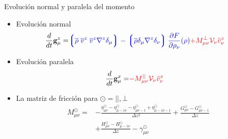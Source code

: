 \documentclass{beamer}
\newcommand{\llg}{\left\lgroup}
\newcommand{\rlg}{\right\rgroup}
\begin{document}
\begin{frame}{Evolución normal y paralela del momento}
\begin{itemize}
  \item Evolución normal 
\begin{align}
    \frac{d}{dt}{{\bf g}}^{z}_\mu=&
{\color{blue} \llg\overline{\rho}\; \overline{v}^{z}\;\overline{v}^{z}{\nabla}^{z}\delta_{\mu}\rlg
-\llg\overline{\rho}\delta_{\mu}{\nabla}^{z}\delta_{\nu}\rlg
\frac{\partial  F}{\partial \rho_{\nu}}(\rho)}
{\color{red} +M_{\mu\nu}^{\bot}{\cal V}_\nu\tilde{v}^{z}_\nu}
\nonumber
\end{align}
  \item Evolución paralela 
\begin{align}
  \frac{d}{dt}{{\bf g}}^x_\mu=&{\color{red}-M_{\mu\nu}^{||}{\cal V}_\nu\tilde{v}^x_\nu}
\nonumber
\end{align}
\item La matriz de fricción para $\odot=||,\bot$
\begin{align}
M^{\odot}_{\mu\nu} 
=&-\frac{\eta^{\odot}_{\mu\nu}-\eta^{\odot}_{\mu-1\nu}-\eta^{\odot}_{\mu\nu-1}+\eta^{\odot}_{\mu-1\nu-1}}{\Delta z^2}
+\frac{{G}^{\odot}_{\mu\nu}-{G}^{\odot}_{\mu\nu-1}}{\Delta z} \nonumber \\
&+\frac{{H}^{\odot}_{\mu\nu}-{H}^{\odot}_{\mu-1\nu}}{\Delta z}
-{\gamma}^{\odot}_{\mu\nu}
\nonumber
\end{align}
\end{itemize}
\end{frame}
\end{document}
